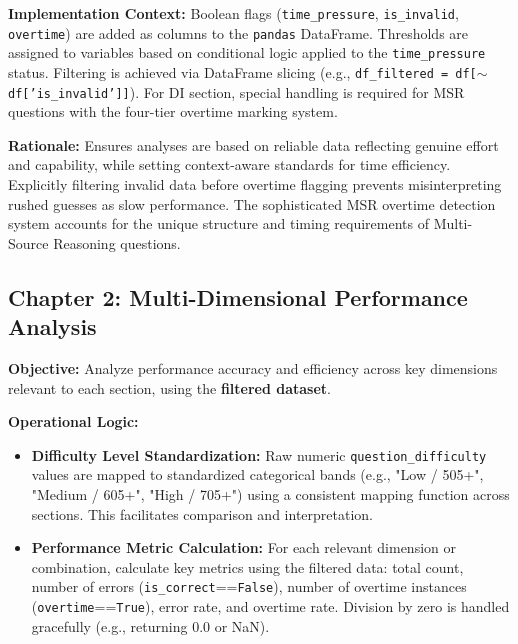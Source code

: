 \documentclass{article}
\begin{document}

\textbf{Implementation Context:} Boolean flags (\texttt{time\_pressure}, \texttt{is\_invalid}, \texttt{overtime}) are added as columns to the \texttt{pandas} DataFrame. Thresholds are assigned to variables based on conditional logic applied to the \texttt{time\_pressure} status. Filtering is achieved via DataFrame slicing (e.g., \texttt{df\_filtered = df[$\sim$df['is\_invalid']]}). For DI section, special handling is required for MSR questions with the four-tier overtime marking system.

\textbf{Rationale:} Ensures analyses are based on reliable data reflecting genuine effort and capability, while setting context-aware standards for time efficiency. Explicitly filtering invalid data before overtime flagging prevents misinterpreting rushed guesses as slow performance. The sophisticated MSR overtime detection system accounts for the unique structure and timing requirements of Multi-Source Reasoning questions.

\subsection{Chapter 2: Multi-Dimensional Performance Analysis}

\textbf{Objective:} Analyze performance accuracy and efficiency across key dimensions relevant to each section, using the \textbf{filtered dataset}.

\textbf{Operational Logic:}
\begin{itemize}
    \item \textbf{Difficulty Level Standardization:} Raw numeric \texttt{question\_difficulty} values are mapped to standardized categorical bands (e.g., "Low / 505+", "Medium / 605+", "High / 705+") using a consistent mapping function across sections. This facilitates comparison and interpretation.
    \item \textbf{Performance Metric Calculation:} For each relevant dimension or combination, calculate key metrics using the filtered data: total count, number of errors (\texttt{is\_correct}==\texttt{False}), number of overtime instances (\texttt{overtime}==\texttt{True}), error rate, and overtime rate. Division by zero is handled gracefully (e.g., returning 0.0 or NaN).
\end{itemize}
\end{document}

